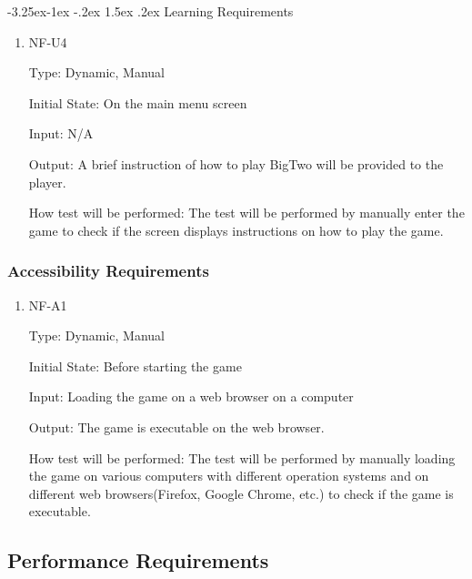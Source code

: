\documentclass[12pt, titlepage]{article}
\makeatletter
\renewcommand\paragraph{\@startsection{paragraph}{4}{\z@}%
                                     {-3.25ex\@plus -1ex \@minus -.2ex}%
                                     {1.5ex \@plus .2ex}%
                                     {\normalfont\normalsize\bfseries}}
\makeatother
\begin{document}
\paragraph{Learning Requirements}
\begin{enumerate}
\item{NF-U4\\}

Type:  Dynamic, Manual
					
Initial State: On the main menu screen
					
Input: N/A
					
Output: A brief instruction of how to play BigTwo will be provided to the player.
					
How test will be performed: The test will be performed by manually enter the game to check if the screen displays instructions on how to play the game. 

\end{enumerate}

\subsubsection{Accessibility Requirements}
\begin{enumerate}
\item{NF-A1\\}

Type:  Dynamic, Manual
					
Initial State: Before starting the game
					
Input: Loading the game on a web browser on a computer
					
Output: The game is executable on the web browser.
					
How test will be performed: The test will be performed by manually loading the game on various computers with different operation systems and on different web browsers(Firefox, Google Chrome, etc.) to check if the game is executable. 

\end{enumerate}

\subsection{Performance Requirements}
\end{document}
